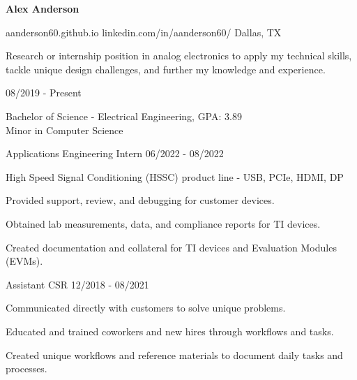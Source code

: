 \documentclass[11pt]{article}
\begin{document}
\centerline{{\Huge \bf Alex Anderson}}

\bigskip

        {aanderson60.github.io}
        {linkedin.com/in/aanderson60/}
        {Dallas, TX}

Research or internship position in analog electronics to apply my technical skills, tackle unique design challenges, and further my knowledge and experience.


\begin{description}
\squish
{}
            {}
            {08/2019 - Present}

Bachelor of Science - Electrical Engineering, GPA: 3.89\\
Minor in Computer Science 

\end{description}


\begin{description}
      \squish
                 {Applications Engineering Intern}
                 {06/2022 - 08/2022}
      
      High Speed Signal Conditioning (HSSC) product line - USB, PCIe, HDMI, DP
      
      Provided support, review, and debugging for customer devices.
      
      Obtained lab measurements, data, and compliance reports for TI devices.
      
      Created documentation and collateral for TI devices and Evaluation Modules (EVMs).
      
\end{description}

\begin{description}
\squish
{}
           {Assistant CSR}
           {12/2018 - 08/2021}

Communicated directly with customers to solve unique problems.

Educated and trained coworkers and new hires through workflows and tasks.

Created unique workflows and reference materials to document daily tasks and processes.

\end{description}
\end{document}
